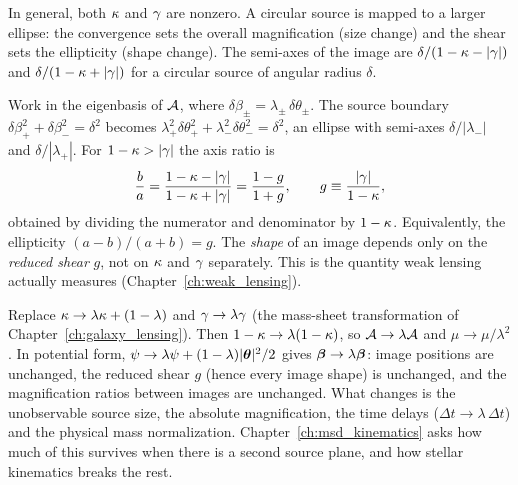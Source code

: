 In general, both $\kappa$ and $\gamma$ are nonzero.  A circular
source is mapped to a larger ellipse: the convergence sets the overall
magnification (size change) and the shear sets the ellipticity (shape
change).
The semi-axes of the image are $\delta/(1 - \kappa - |\gamma|)$ and
$\delta/(1 - \kappa + |\gamma|)$ for a circular source of angular
radius $\delta$.
\begin{derivation}
Work in the eigenbasis of $\mathcal{A}$, where $\delta\beta_\pm = \lambda_\pm\,\delta\theta_\pm$.
The source boundary $\delta\beta_+^2 + \delta\beta_-^2 = \delta^2$ becomes
$\lambda_+^2\delta\theta_+^2 + \lambda_-^2\delta\theta_-^2 = \delta^2$, an
ellipse with semi-axes $\delta/|\lambda_-|$ and $\delta/|\lambda_+|$. For
$1 - \kappa > |\gamma|$ the axis ratio is
\begin{equation*}
    \frac{b}{a} = \frac{1 - \kappa - |\gamma|}{1 - \kappa + |\gamma|}
    = \frac{1 - g}{1 + g},
    \qquad g \equiv \frac{|\gamma|}{1 - \kappa},
\end{equation*}
obtained by dividing the numerator and denominator by $1 - \kappa$. Equivalently, the ellipticity
$(a-b)/(a+b) = g$. The \emph{shape} of an image depends only on the
\emph{reduced shear} $g$, not on $\kappa$ and $\gamma$ separately. This is
the quantity weak lensing actually measures (Chapter~\ref{ch:weak_lensing}).
\end{derivation}
\begin{bridge}
Replace $\kappa \to \lambda\kappa + (1-\lambda)$ and $\gamma \to \lambda\gamma$
(the mass-sheet transformation of Chapter~\ref{ch:galaxy_lensing}). Then
$1 - \kappa \to \lambda(1 - \kappa)$, so $\mathcal{A} \to \lambda\mathcal{A}$ and $\mu \to \mu/\lambda^2$.
In potential form, $\psi \to \lambda\psi + (1-\lambda)|\boldsymbol{\theta}|^2/2$ gives
$\boldsymbol{\beta} \to \lambda\boldsymbol{\beta}$: image positions are unchanged, the reduced shear
$g$ (hence every image shape) is unchanged, and the magnification ratios between
images are unchanged. What changes is the unobservable source size, the
absolute magnification, the time delays ($\Delta t \to \lambda\,\Delta t$) and
the physical mass normalization. Chapter~\ref{ch:msd_kinematics} asks how much of this
survives when there is a second source plane, and how stellar kinematics
breaks the rest.
\end{bridge}

